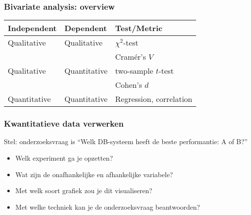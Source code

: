 \documentclass[aspectratio=169]{beamer}
\begin{document}
\begin{frame}
  \frametitle{Bivariate analysis: overview}
  \centering
  \begin{tabular}{lll}
    \toprule
    \textbf{Independent} & \textbf{Dependent} & \textbf{Test/Metric}    \\
    \midrule
    Qualitative          & Qualitative        & $\chi^2$-test           \\
                         &                    & Cramér's $V$            \\
    Qualitative          & Quantitative       & two-sample $t$-test     \\
                         &                    & Cohen's $d$             \\
    Quantitative         & Quantitative       & Regression, correlation \\
    \bottomrule
  \end{tabular}

  \bigskip

\end{frame}

\begin{frame}
  \frametitle{Kwantitatieve data verwerken}

  Stel: onderzoeksvraag is ``Welk DB-systeem heeft de beste performantie: A of B?''

  \begin{itemize}
    \item<+-> Welk experiment ga je opzetten?
    \item<+-> Wat zijn de onafhankelijke en afhankelijke variabele?
    \item<+-> Met welk soort grafiek zou je dit visualiseren?
    \item<+-> Met welke techniek kan je de onderzoeksvraag beantwoorden?
  \end{itemize}

\end{frame}
\end{document}
